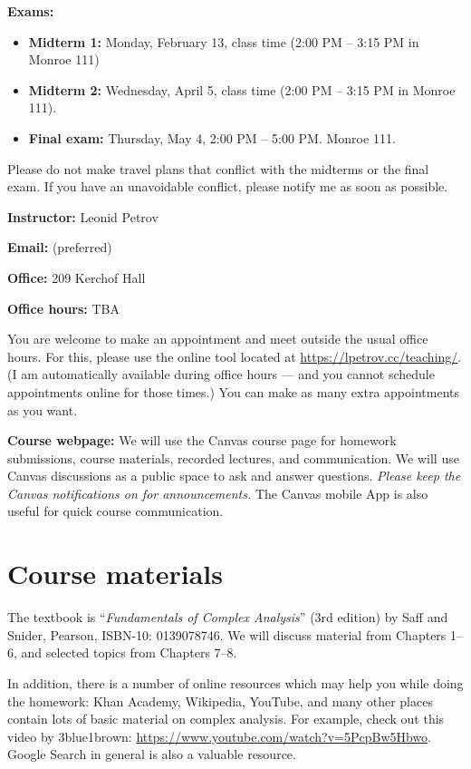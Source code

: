 \documentclass[oneside,11pt]{amsart}
\begin{document}
\medskip

\textbf{Exams:}
\begin{itemize}
	\item \textbf{Midterm 1:} Monday, February 13, class time (2:00 PM -- 3:15 PM in Monroe 111)
	\item \textbf{Midterm 2:} Wednesday, April 5, class time (2:00 PM -- 3:15 PM in Monroe 111).
	\item \textbf{Final exam:} Thursday, May 4, 2:00 PM -- 5:00 PM. Monroe 111.
\end{itemize}
Please do not make travel plans that conflict
with the midterms or the final exam. If you have an unavoidable conflict, please notify me as soon as possible.

\medskip

\textbf{Instructor:} Leonid Petrov
\medskip

\textbf{Email:}  (preferred)
\medskip

\textbf{Office:} 209 Kerchof Hall
\medskip

\textbf{Office hours:}
TBA

You are welcome to make an appointment and meet outside the usual office hours. 
For this, please use the online tool located at
\url{https://lpetrov.cc/teaching/}. (I am automatically available during office hours --- 
and you cannot schedule appointments online for those times.)
You can make as 
many extra appointments as you want.

\medskip

\textbf{Course webpage:}
We will use the Canvas course page for homework submissions, course materials, recorded 
lectures, and communication. We will use Canvas discussions as a public space to ask and answer questions. 
\textit{Please keep the Canvas notifications on for announcements.}
The Canvas mobile App is also useful for quick course communication.

\section{Course materials}
\label{sec:textbook}

The textbook is “\emph{Fundamentals of Complex Analysis}” (3rd edition)
by Saff and Snider, Pearson, ISBN-10: 0139078746.
We will discuss material from Chapters 1--6, and selected topics from Chapters 7--8.

\medskip

In addition, there is a number of online resources which may help you while doing the homework:
Khan Academy, Wikipedia, YouTube, and many other 
places contain lots of basic material on complex analysis. 
For example, check out this video by 3blue1brown: \url{https://www.youtube.com/watch?v=5PcpBw5Hbwo}.
Google Search
in general
is also a valuable resource.
\end{document}
